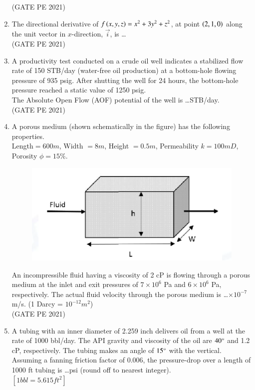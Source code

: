 \documentclass[journal,12pt,onecolumn]{IEEEtran}
\theoremstyle{remark}
\begin{document}
\begin{enumerate}
\hfill{(GATE PE 2021)}

\item The directional derivative of $f\left(x,y,z\right)=x^2+3y^2+z^2$, at point $\left(2,1,0\right)$ along the unit vector in $x$-direction, $\vec{i}$, is \dots \\

\hfill{(GATE PE 2021)}

\item A productivity test conducted on a crude oil well indicates a stabilized flow rate of 150 STB/day (water-free oil production) at a bottom-hole flowing pressure of 935 psig. After shutting the well for 24 hours, the bottom-hole pressure reached a static value of 1250 psig.\\
The Absolute Open Flow (AOF) potential of the well is \dots STB/day.\\

\hfill{(GATE PE 2021)}

\item A porous medium (shown schematically in the figure) has the following properties.\\
Length$=600m$, Width $=8m$, Height $=0.5m$, Permeability $k=100mD$, Porosity $\phi=15\%$.
\begin{figure}[h]
    \centering
    \includegraphics[width=0.5\linewidth]{Q_45.png}
    \caption{}
    \label{fig:placeholder}
\end{figure}
An incompressible fluid having a viscosity of 2 cP is flowing through a porous medium at the inlet and exit pressures of $7\times 10^6$ Pa and $6\times 10^6$ Pa, respectively.
The actual fluid velocity through the porous medium is \dots $\times 10^{-7}$ m/s.
(1 Darcy = $10^{-12} m^2$)\\

\hfill{(GATE PE 2021)}

\item A tubing with an inner diameter of 2.259 inch delivers oil from a well at the rate of 1000 bbl/day. The API gravity and viscosity of the oil are $40\degree$ and 1.2 cP, respectively. The tubing makes an angle of $15\degree$ with the vertical. Assuming a fanning friction factor of $0.006$, the pressure-drop over a length of 1000 ft tubing is \dots psi (round off to nearest integer).\\
$[1bbl =5.615 ft^2]$ \\


\end{enumerate}
\end{document}
